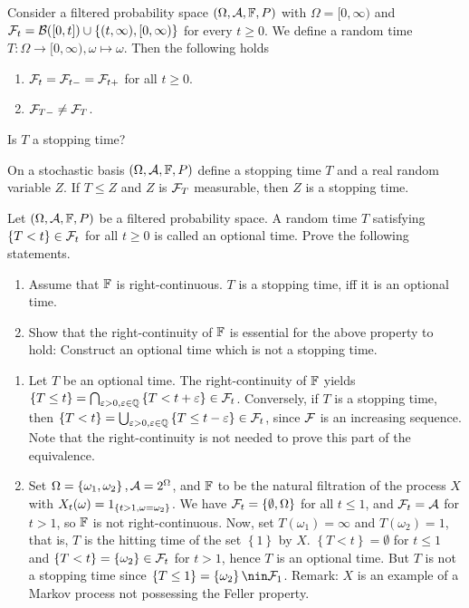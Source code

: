 Consider a filtered probability space $(\Omega, \mathcal A, \mathbb F, P)$ with $\Omega =
[0, \infty)$ and $\mathcal F_t = \mathcal B([0,t]) \cup \left\{ (t,\infty), [0, \infty)
\right\}$ for every $t\geq 0$. We define a random time $T:\Omega\to[0,\infty),
\omega \mapsto \omega$.  Then the following holds
\begin{enumerate}
    \item $\mathcal F_{t} = \mathcal F_{t-} = \mathcal F_{t+}$ for all $t\geq 0$.
    \item $\mathcal F_{T-} \neq \mathcal F_{T}$.
\end{enumerate}
Is $T$ a stopping time?

On a stochastic basis $(\Omega, \mathcal A, \mathbb F, P)$ define a stopping time $T$ and a
real random variable $Z$. If $T \leq Z$ and $Z$ is $\mathcal F_{T}$ measurable, then
$Z$ is a stopping time.

 Let $(\Omega, \mathcal A,
\mathbb F, P)$ be a filtered probability space. A random time $T$ satisfying
$\{T<t\}\in\mathcal F_{t}$ for all $t\geq 0$ is called an optional time. Prove the
following statements.
\begin{enumerate}
    \item Assume that $\mathbb F$ is right-continuous. $T$ is a stopping time, iff it
        is an optional time.
    \item Show that the right-continuity of $\mathbb F$ is essential for the above
        property to hold: Construct an optional time which is not a stopping
        time.
\end{enumerate}

\solution 
\begin{enumerate}
    \item Let $T$ be an optional time. The right-continuity of $\mathbb F$ yields
        $\left\{ T\leq t \right\} = \bigcap_{\varepsilon>0, \varepsilon\in\mathbb Q}
        \left\{ T<t+\varepsilon \right\} \in \mathcal F_{t}$. Conversely, if $T$ is a
        stopping time, then $\left\{ T<t \right\} =
        \bigcup_{\varepsilon>0,\varepsilon\in\mathbb Q} \left\{ T \leq t-\varepsilon
        \right\}\in \mathcal F_t$, since $\mathcal F$ is an increasing sequence. Note that the
        right-continuity is not needed to prove this part of the equivalence. 
    \item Set $\Omega = \left\{ \omega_{1}, \omega_{2} \right\}, \mathcal A =
        2^{\Omega}$, and $\mathbb F$ to be the natural filtration of the process $X$
        with $X_t(\omega) = 1_{ \left\{ t>1, \omega= \omega_{2} \right\} }$.
        We have $\mathcal F_{t} = \left\{ \emptyset, \Omega \right\}$ for all $t\leq
        1$, and $\mathcal F_{t} = \mathcal A$ for $t>1$, so $\mathbb F$ is not right-continuous.
        Now, set $T(\omega_{1}) = \infty$ and $T(\omega_{2}) = 1$, that is, $T$
        is the hitting time of the set $\left\{ 1 \right\}$ by $X$. $\left\{ T
        < t \right\} = \emptyset$ for $t\leq 1$ and $\left\{ T < t  \right\} =
        \left\{ \omega_{2} \right\} \in \mathcal F_{t}$ for $t>1$, hence $T$ is an
        optional time.  But $T$ is not a stopping time since $\left\{ {T\leq 1}
    \right\} = \left\{ \omega_{2} \right\} \nin \cF_{1}$. Remark: $X$ is an
    example of a Markov process not possessing the Feller property. 
\end{enumerate}


